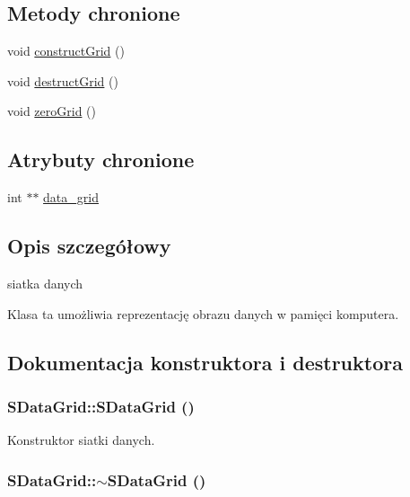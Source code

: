 \subsection*{Metody chronione}
\begin{CompactItemize}
\item 
void \hyperlink{classSDataGrid_5af888335764c1ba959b6ef964223b6d}{constructGrid} ()
\item 
void \hyperlink{classSDataGrid_c9c0ef298fb96c56f9f9796720a41489}{destructGrid} ()
\item 
void \hyperlink{classSDataGrid_df36584ac2e2d38eda1bd06ad8fad355}{zeroGrid} ()
\end{CompactItemize}
\subsection*{Atrybuty chronione}
\begin{CompactItemize}
\item 
int $\ast$$\ast$ \hyperlink{classSDataGrid_6401d181afc8b06f75fcec860b02e9cb}{data\_\-grid}
\end{CompactItemize}


\subsection{Opis szczegółowy}
siatka danych 

Klasa ta umożliwia reprezentację obrazu danych w pamięci komputera. 

\subsection{Dokumentacja konstruktora i destruktora}
\hypertarget{classSDataGrid_741ea12ba0eec8c00fec30c8730f2192}{
\subsubsection[{SDataGrid}]{\setlength{\rightskip}{0pt plus 5cm}SDataGrid::SDataGrid ()}}
\label{classSDataGrid_741ea12ba0eec8c00fec30c8730f2192}


Konstruktor siatki danych. \hypertarget{classSDataGrid_51645b217b4c668e0e945cdbda1db3ec}{
\subsubsection[{$\sim$SDataGrid}]{\setlength{\rightskip}{0pt plus 5cm}SDataGrid::$\sim$SDataGrid ()}}
\label{classSDataGrid_51645b217b4c668e0e945cdbda1db3ec}


